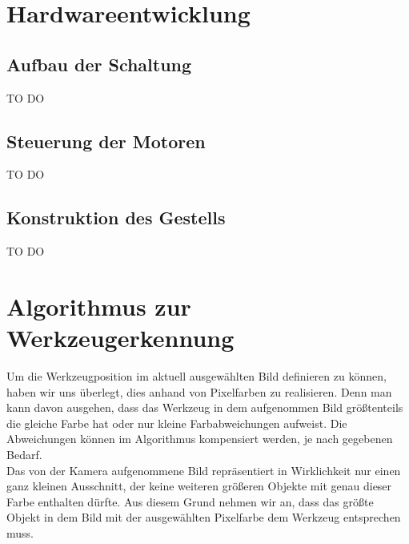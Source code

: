 \documentclass[12pt,a4paper,bibliography=totocnumbered,listof=totocnumbered]{scrartcl}
\begin{document}
\section{Hardwareentwicklung}
\subsection{Aufbau der Schaltung}
TO DO
\subsection{Steuerung der Motoren}
TO DO
\subsection{Konstruktion des Gestells}
TO DO

\section{Algorithmus zur Werkzeugerkennung}

Um die Werkzeugposition im aktuell ausgewählten Bild definieren zu können, haben wir uns überlegt, dies anhand von Pixelfarben zu realisieren. Denn man kann davon ausgehen, dass das Werkzeug in dem aufgenommen Bild größtenteils die gleiche Farbe hat oder nur kleine Farbabweichungen aufweist. Die Abweichungen können im Algorithmus kompensiert werden, je nach gegebenen Bedarf. \\  
Das von der Kamera aufgenommene Bild repräsentiert in Wirklichkeit nur einen ganz kleinen Ausschnitt, der keine weiteren größeren Objekte mit genau dieser Farbe enthalten dürfte. Aus diesem Grund nehmen wir an, dass das größte Objekt in dem Bild mit der ausgewählten Pixelfarbe dem Werkzeug entsprechen muss.
\end{document}
